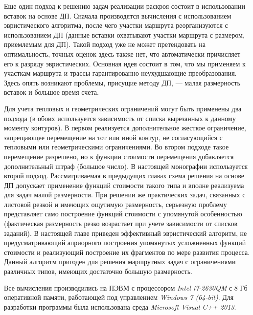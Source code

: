 Еще один подход к решению задач реализации раскроя состоит в использовании
вставок на основе ДП.
Сначала производятся вычисления с использованием эвристического алгоритма,
после чего участки маршрута реорганизуются с использованием ДП
(данные вставки охватывают участки маршрута с размером, приемлемым для ДП).
Такой подход уже не может претендовать на оптимальность,
точных оценок здесь также нет,
что автоматически причисляет его к разряду эвристических.
Основная идея состоит в том, что мы применяем
к участкам маршрута и трассы гарантированно неухудшающие преобразования.
Здесь опять возникают проблемы, присущие методу ДП, ---
малая размерность вставок и большое время счета.

Для учета тепловых и геометрических ограничений могут быть применены два подхода
(в обоих используется зависимость от списка вырезанных к данному моменту контуров).
В первом реализуется дополнительное жесткое ограничение,
запрещающее перемещение на тот или иной контур,
не согласующийся с тепловыми или геометрическими ограничениями.
Во втором подходе такое перемещение разрешено,
но к функции стоимости перемещения добавляется дополнительный штраф
(большое число).
В настоящей монографии используется второй подход.
Рассматриваемая в предыдущих главах схема решения на основе ДП
допускает применение функций стоимости такого типа и вполне реализуема для
задач малой размерности.
При решении же практических задач,
связанных с листовой резкой и имеющих ощутимую размерность,
серьезную проблему представляет само построение функций стоимости с упомянутой особенностью
(фактическая размерность резко возрастает при учете зависимости от списков заданий).
В настоящей главе приведен эффективный эвристический алгоритм,
не предусматривающий априорного построения упомянутых усложненных функций
стоимости и реализующий построение их фрагментов по мере развития процесса.
Данный алгоритм пригоден для решения маршрутных задач с ограничениями
различных типов,
имеющих достаточно большую размерность.

Все вычисления производились на ПЭВМ с процессором
{\it Intel i7-2630QM}
с 8 Гб оперативной памяти, работающей под управлением
{\it Windows 7 (64-bit)}.
Для разработки программы была использована среда
{\it Microsoft Visual C++ 2013}.
